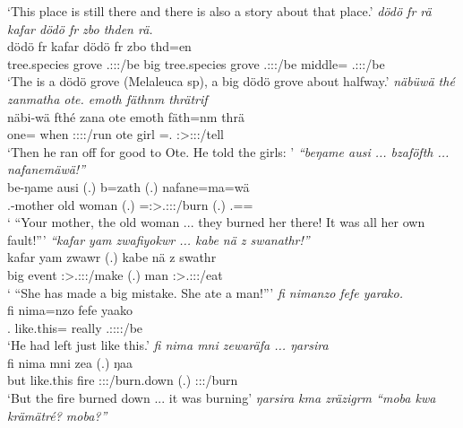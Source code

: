 \begin{exe}
	\trans `This place is still there and there is also a story about that place.'
	\emph{dödö fr rä kafar dödö fr zbo thden rä.}\\
	\gll dödö fr  kafar dödö fr zbo thd=en \\
	{tree.species} grove \Tsg.\F:\Sbj:\Nonpast:\Ipfv/be big {tree.species} grove \Tsg.\F:\Sbj:\Nonpast:\Ipfv/be middle={\Loc} \Tsg.\F:\Sbj:\Nonpast:\Ipfv/be\\
	\trans `The is a dödö grove (Melaleuca sp), a big dödö grove about halfway.'
	\emph{näbüwä thé zanmatha ote. emoth fäthnm thrätrif}\\
	\gll näbi-wä fthé zana ote emoth fäth=nm thrä\\
	one={\Emph} when \Sg:\Sbj:\Pst:\Pfv:\Venit/run ote girl \Dim=\Dat.{\Nsg} \Stsg:\Sbj>\Stpl:\Io:\Irr:\Pfv/tell\\
	\trans `Then he ran off for good to Ote. He told the girls: '
	\emph{``beŋame ausi ... bzaföfth ... nafanemäwä!''}\\
	\gll be-ŋame ausi (.) b=zath (.) nafane=ma=wä\\
	\Snsg.\Poss-mother {old woman} (.) \Med=\Stpl:\Sbj>\Tsg.\F:\Obj:\Pst:\Pfv/burn (.) \Tsg.\Poss=\Char={\Emph}\\
	\trans ` ``Your mother, the old woman ... they burned her there! It was all her own fault!'''
	\emph{``kafar yam zwafiyokwr ... kabe nä z swanathr!''}\\
	\gll kafar yam zwawr (.) kabe nä z swathr\\
	big event \Stsg:\Sbj>\Tsg.\F:\Obj:\Rpst:\Ipfv/make (.) man {\Indf} {\Iam} \Stsg:\Sbj>\Tsg.\Masc:\Obj:\Rpst:\Ipfv/eat\\
	\trans ` ``She has made a big mistake. She ate a man!'''
	\emph{fi nimanzo fefe yarako.}\\
	\gll fi nima=nzo fefe yaako\\
	\Third.{\Abs} {like.this}={\Only} really \Tsg.\Masc:\Sbj:\Pst:\Ipfv:\Andat/be\\
	\trans `He had left just like this.'
	\emph{fi nima mni zewaräfa ... ŋarsira}\\
	\gll fi nima mni zea (.) ŋaa\\
	but {like.this} fire \Sg:\Sbj:\Pst:\Pfv/burn.down (.) \Sg:\Sbj:\Pst:\Ipfv/burn\\
	\trans `But the fire burned down ... it was burning'
	\emph{ŋarsira kma zräzigrm ``moba kwa krämätré? moba?''}\\

\end{exe}
